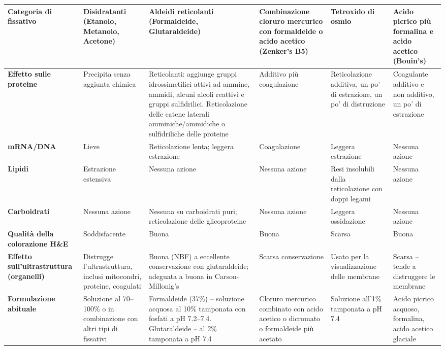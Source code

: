 \tiny
\begin{landscape}
\begin{longtable}{|p{3.5cm}|p{3cm}|p{3.5cm}|p{3cm}|p{3cm}|p{3.5cm}|}
\hline
\textbf{Categoria di fissativo} & \textbf{Disidratanti} (Etanolo, Metanolo, Acetone) & \textbf{Aldeidi reticolanti} (Formaldeide, Glutaraldeide) & \textbf{Combinazione cloruro mercurico con formaldeide o acido acetico} (Zenker’s B5) & \textbf{Tetroxido di osmio} & \textbf{Acido picrico più formalina e acido acetico} (Bouin's) \\ \hline \thispagestyle{empty}
\textbf{Effetto sulle proteine} & Precipita senza aggiunta chimica & Reticolanti: aggiunge gruppi idrossimetilici attivi ad ammine, ammidi, alcuni alcoli reattivi e gruppi sulfidrilici. Reticolazione delle catene laterali amminiche/ammidiche o sulfidriliche delle proteine & Additivo più coagulazione & Reticolazione additiva, un po' di estrazione, un po' di distruzione & Coagulante additivo e non additivo, un po' di estrazione \\ \hline
\textbf{mRNA/DNA} & Lieve & Reticolazione lenta; leggera estrazione & Coagulazione & Leggera estrazione & Nessuna azione \\ \hline
\textbf{Lipidi} & Estrazione estensiva & Nessuna azione & Nessuna azione & Resi insolubili dalla reticolazione con doppi legami & Nessuna azione \\ \hline
\textbf{Carboidrati} & Nessuna azione & Nessuna su carboidrati puri; reticolazione delle glicoproteine & Nessuna azione & Leggera ossidazione & Nessuna azione \\ \hline
\textbf{Qualità della colorazione H\&E} & Soddisfacente & Buona & Buona & Scarsa & Buona \\ \hline
\textbf{Effetto sull'ultrastruttura (organelli)} & Distrugge l'ultrastruttura, inclusi mitocondri, proteine, coagulati & Buona (NBF) a eccellente conservazione con glutaraldeide; adeguata a buona in Carson-Millonig's & Scarsa conservazione & Usato per la visualizzazione delle membrane & Scarsa – tende a distruggere le membrane \\ \hline
\textbf{Formulazione abituale} & Soluzione al 70–100\% o in combinazione con altri tipi di fissativi & Formaldeide (37\%) – soluzione acquosa al 10\% tamponata con fosfati a pH 7.2–7.4. Glutaraldeide – al 2\% tamponata a pH 7.4 & Cloruro mercurico combinato con acido acetico o dicromato o formaldeide più acetato & Soluzione all'1\% tamponata a pH 7.4 & Acido picrico acquoso, formalina, acido acetico glaciale \\ \hline

\end{longtable}
\end{landscape}

